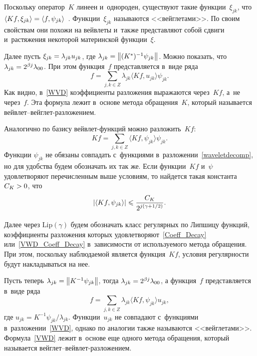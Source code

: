 \begin{multicols}{2}
Поскольку оператор~$K$ линеен и~однороден, существуют такие функции~$\xi_{jk}$, 
что $\langle K f, \xi_{jk}\rangle\hm = \langle f, \psi_{jk}\rangle$~\cite{D94}. 
Функции~$\xi_{jk}$ называются <<вейглетами>>. По своим свойствам 
они похожи на вейвлеты и~также представляют собой сдвиги 
и~растяжения некоторой материнской функции~$\xi$.

Далее пусть $\xi_{jk} \hm= \lambda_{jk} u_{jk}$, где $\lambda_{jk} \hm= 
\norm{(K^*)^{-1} \psi_{jk}}$. Можно показать, что 
$\lambda_{jk}\hm=2^{\beta j}\lambda_{00}$.
При этом функция~$f$ представляется в~виде ряда
\begin{equation} 
\label{WVD}
f=\sum\limits_{j,k\in Z}\lambda_{jk}\langle Kf,u_{jk}\rangle\psi_{jk}.
\end{equation}
Как видно, в~\eqref{WVD} коэффициенты разложения выражаются через~$Kf$, 
а~не через~$f$. Эта формула лежит 
в~основе метода обращения~$K$, который называется вейв\-лет--вейг\-лет-раз\-ло\-же\-нием.


Аналогично по базису вейв\-лет-функ\-ций можно разложить~$Kf$:
\begin{equation*}
Kf = \sum\limits_{j,k\in Z} \langle Kf,\psi_{jk}\rangle \psi_{jk}.
\end{equation*}
Функции $\psi_{jk}$ не обязаны совпадать с~функциями в~разложении~\eqref{waveletdecomp}, 
но для удобства будем обозначать их так же. Если функции~$Kf$ и~$\psi$ 
удовлетворяют перечисленным выше условиям, то найдется такая константа $C_K\hm>0$, что
\begin{equation}                                                                           \label{VWD_Coeff_Decay}
\left\vert\langle Kf,\psi_{jk}\rangle\right\vert \leqslant 
\displaystyle\frac{\displaystyle C_K\mathstrut}{\displaystyle 2^{j \left(\gamma +{1}/{2} \right)}\mathstrut}.
\end{equation}

Далее через $\mathrm{Lip}(\gamma)$ будем обозначать класс регулярных по 
Липшицу функций, коэффициенты разложения которых удовлетворяют~\eqref{Coeff_Decay} 
или~\eqref{VWD_Coeff_Decay} в~зависимости от используемого метода обращения. 
При этом, поскольку наблюдаемой является функция~$Kf$, 
условия регулярности будут накладываться на нее. 

Пусть теперь $\lambda_{jk}\hm = \norm{K^{-1}\psi_{jk}}$, тогда $\lambda_{jk}\hm =
 2^{\beta j}\lambda_{00}$, а функция~$f$ представляется в~виде ряда~\cite{AS98}
\begin{equation} 
\label{VWD}
f = \sum\limits_{j,k\in Z}\lambda_{jk}\langle Kf,\psi_{jk}\rangle u_{jk},
\end{equation}
где $u_{jk} = K^{-1}\psi_{jk}/\lambda_{jk}$. Функции~$u_{jk}$ не совпадают с~функциями 
в~разложении~\eqref{WVD}, однако по аналогии также называются <<вейглетами>>. 
Формула~\eqref{VWD} лежит в~основе еще одного метода обращения, который 
называется вейг\-лет--вейв\-лет-раз\-ло\-же\-ни\-ем.


\end{multicols}
